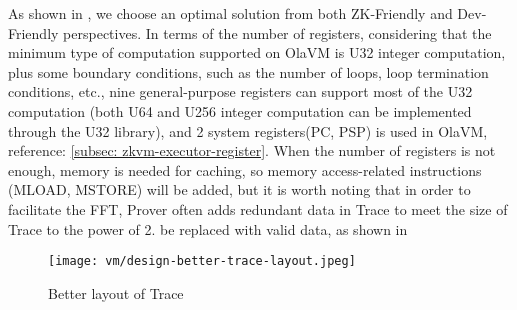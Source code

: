 As shown in , we choose an optimal solution from both ZK-Friendly and Dev-Friendly perspectives. In terms of the number of
registers, considering that the minimum type of computation supported on OlaVM is U32 integer computation, plus some boundary conditions,
such as the number of loops, loop termination conditions, etc., nine general-purpose registers can support most of the U32 computation
(both U64 and U256 integer computation can be implemented through the U32 library), and 2 system registers(PC, PSP) is used in OlaVM, reference: \ref{subsec: zkvm-executor-register}. 
When the number of registers is not enough, memory is needed for caching, so memory access-related instructions
(MLOAD, MSTORE) will be added, but it is worth noting that in order to facilitate the FFT, Prover often adds redundant data in Trace to meet
the size of Trace to the power of 2. be replaced with valid data, as shown in 

\begin{figure}[!ht]
    \centering
    \texttt{[image: vm/design-better-trace-layout.jpeg]}
    \caption{Better layout of Trace}
    \label{fig:desgin-better-trace-layout}
\end{figure}